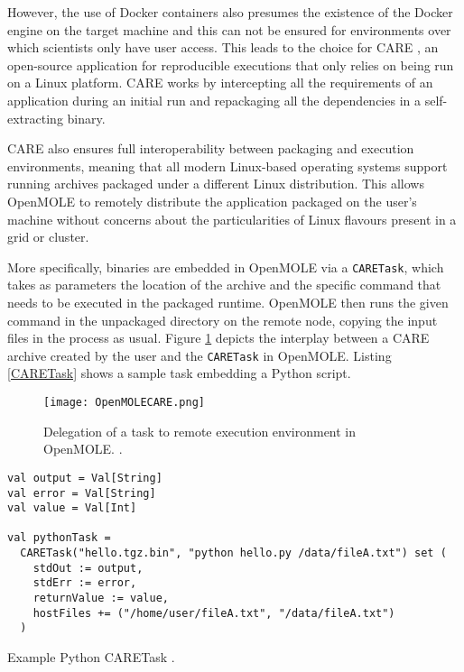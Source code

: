 However, the use of Docker containers also presumes the existence of the Docker engine on the target machine and this can not be ensured for environments over which scientists only have user access. This leads to the choice for CARE \cite{Janin2014}, an open-source application for reproducible executions that only relies on being run on a Linux platform. CARE works by intercepting all the requirements of an application during an initial run and repackaging all the dependencies in a self-extracting binary. 

CARE also ensures full interoperability between packaging and execution environments, meaning that all modern Linux-based operating systems support running archives packaged under a different Linux distribution. This allows OpenMOLE to remotely distribute the application packaged on the user's machine without concerns about the particularities of Linux flavours present in a grid or cluster.

More specifically, binaries are embedded in OpenMOLE via a \verb|CARETask|, which takes as parameters the location of the archive and the specific command that needs to be executed in the packaged runtime. OpenMOLE then runs the given command in the unpackaged directory on the remote node, copying the input files in the process as usual. Figure \ref{OpenMOLECARE} depicts the interplay between a CARE archive created by the user and the \verb|CARETask| in OpenMOLE. Listing \ref{CARETask} shows a sample task embedding a Python script.

\begin{figure}[h]
	\centering
		\texttt{[image: OpenMOLECARE.png]}
	\caption{Delegation of a task to remote execution environment in OpenMOLE. \cite{Leclaire2016}.}
	\label{OpenMOLECARE}
\end{figure}

\begin{listing}[h]
	\centering
	\begin{minipage}{13cm}
		\begin{verbatim}
val output = Val[String]
val error = Val[String]
val value = Val[Int]

val pythonTask = 
  CARETask("hello.tgz.bin", "python hello.py /data/fileA.txt") set ( 
    stdOut := output,
    stdErr := error, 
    returnValue := value, 
    hostFiles += ("/home/user/fileA.txt", "/data/fileA.txt") 
  )
		\end{verbatim}
	\end{minipage}
	\caption{Example Python CARETask \cite{Leclaire2016}.}
	\label{CARETask}
\end{listing}

